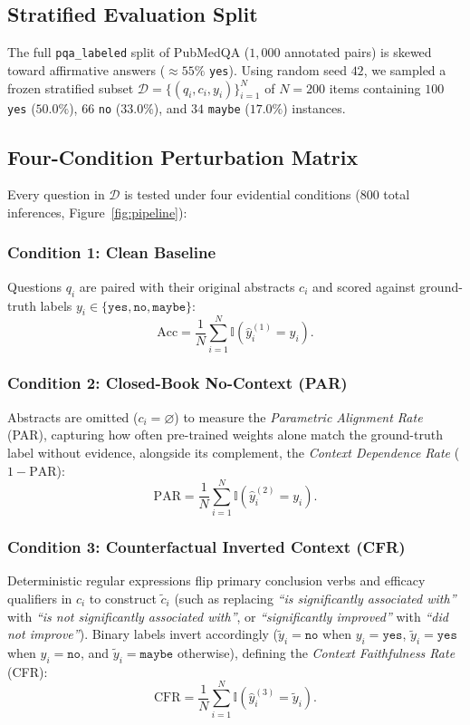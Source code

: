 \documentclass[10pt,twocolumn,letterpaper]{article}
\begin{document}
\subsection{Stratified Evaluation Split}
The full \texttt{pqa\_labeled} split of PubMedQA ($1,000$ annotated pairs) is skewed toward affirmative answers ($\approx 55\%$ \texttt{yes}). Using random seed $42$, we sampled a frozen stratified subset $\mathcal{D} = \{(q_i, c_i, y_i)\}_{i=1}^{N}$ of $N = 200$ items containing $100$ \texttt{yes} ($50.0\%$), $66$ \texttt{no} ($33.0\%$), and $34$ \texttt{maybe} ($17.0\%$) instances.

\subsection{Four-Condition Perturbation Matrix}
Every question in $\mathcal{D}$ is tested under four evidential conditions ($800$ total inferences, Figure~\ref{fig:pipeline}):

\subsubsection{Condition 1: Clean Baseline}
Questions $q_i$ are paired with their original abstracts $c_i$ and scored against ground-truth labels $y_i \in \{\texttt{yes}, \texttt{no}, \texttt{maybe}\}$:
\begin{equation}
\text{Acc} = \frac{1}{N}\sum_{i=1}^{N} \mathbb{I}(\hat{y}_i^{(1)} = y_i).
\end{equation}

\subsubsection{Condition 2: Closed-Book No-Context (PAR)}
Abstracts are omitted ($c_i = \varnothing$) to measure the \textit{Parametric Alignment Rate} (PAR), capturing how often pre-trained weights alone match the ground-truth label without evidence, alongside its complement, the \textit{Context Dependence Rate} ($1 - \text{PAR}$):
\begin{equation}
\text{PAR} = \frac{1}{N}\sum_{i=1}^{N} \mathbb{I}(\hat{y}_i^{(2)} = y_i).
\end{equation}

\subsubsection{Condition 3: Counterfactual Inverted Context (CFR)}
Deterministic regular expressions flip primary conclusion verbs and efficacy qualifiers in $c_i$ to construct $\tilde{c}_i$ (such as replacing \textit{``is significantly associated with''} with \textit{``is not significantly associated with''}, or \textit{``significantly improved''} with \textit{``did not improve''}). Binary labels invert accordingly ($\tilde{y}_i = \texttt{no}$ when $y_i = \texttt{yes}$, $\tilde{y}_i = \texttt{yes}$ when $y_i = \texttt{no}$, and $\tilde{y}_i = \texttt{maybe}$ otherwise), defining the \textit{Context Faithfulness Rate} (CFR):
\begin{equation}
\text{CFR} = \frac{1}{N}\sum_{i=1}^{N} \mathbb{I}(\hat{y}_i^{(3)} = \tilde{y}_i).
\end{equation}
\end{document}

